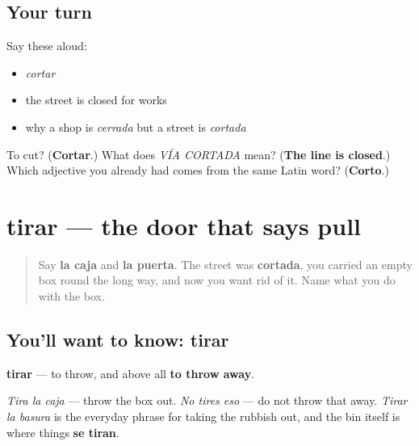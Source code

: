 \subsection*{Your turn}
Say these aloud:

\begin{itemize}
\raggedright
  \item \emph{cortar}
  \item the street is closed for works
  \item why a shop is \emph{cerrada} but a street is \emph{cortada}
\end{itemize}

\begin{tcolorbox}[breakable,colback=teal!4,colframe=teal!35!black,title={Before you move on}]
To cut? (\textbf{Cortar}.) What does \emph{VÍA CORTADA} mean? (\textbf{The line is closed}.) Which adjective you already had comes from the same Latin word? (\textbf{Corto}.)
\end{tcolorbox}
\section[tirar]{tirar — the door that says pull}

\label{lesson:ES-C439-tirar}



\begin{quote}
Say \textbf{la caja} and \textbf{la puerta}. The street was \textbf{cortada}, you carried an empty box round the long way, and now you want rid of it. Name what you do with the box.
\end{quote}

\subsection*{You'll want to know: tirar}
\textbf{tirar} — to throw, and above all \textbf{to throw away}.

\emph{Tira la caja} — throw the box out. \emph{No tires eso} — do not throw that away. \emph{Tirar la basura} is the everyday phrase for taking the rubbish out, and the bin itself is where things \textbf{se tiran}.


